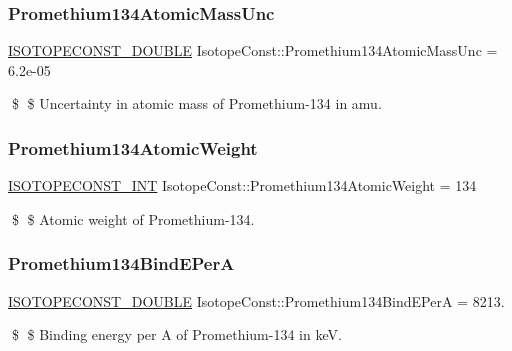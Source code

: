 \subsubsection{\texorpdfstring{Promethium134\+Atomic\+Mass\+Unc}{Promethium134AtomicMassUnc}}
{\footnotesize\ttfamily \mbox{\hyperlink{group___isotope_const-_macros_ga8f45a7272ce02c0b4c65c44636ed719a}{I\+S\+O\+T\+O\+P\+E\+C\+O\+N\+S\+T\+\_\+\+D\+O\+U\+B\+LE}} Isotope\+Const\+::\+Promethium134\+Atomic\+Mass\+Unc = 6.\+2e-\/05}

\$ \$ Uncertainty in atomic mass of Promethium-\/134 in amu. \mbox{\label{group___isotope_const-_promethium-_pm134_gac8820af5deab0b9e66a4c42327fabe10}} 
\subsubsection{\texorpdfstring{Promethium134\+Atomic\+Weight}{Promethium134AtomicWeight}}
{\footnotesize\ttfamily \mbox{\hyperlink{group___isotope_const-_macros_ga5f18360b3e99483a35c32d789e62621c}{I\+S\+O\+T\+O\+P\+E\+C\+O\+N\+S\+T\+\_\+\+I\+NT}} Isotope\+Const\+::\+Promethium134\+Atomic\+Weight = 134}

\$ \$ Atomic weight of Promethium-\/134. \mbox{\label{group___isotope_const-_promethium-_pm134_ga15d1b2e19480997a9b3d8e05e141eb06}} 
\subsubsection{\texorpdfstring{Promethium134\+Bind\+E\+PerA}{Promethium134BindEPerA}}
{\footnotesize\ttfamily \mbox{\hyperlink{group___isotope_const-_macros_ga8f45a7272ce02c0b4c65c44636ed719a}{I\+S\+O\+T\+O\+P\+E\+C\+O\+N\+S\+T\+\_\+\+D\+O\+U\+B\+LE}} Isotope\+Const\+::\+Promethium134\+Bind\+E\+PerA = 8213.}

\$ \$ Binding energy per A of Promethium-\/134 in keV. \mbox{\label{group___isotope_const-_promethium-_pm134_ga416d1239113e9f17899f2b8d39d1597d}} 
